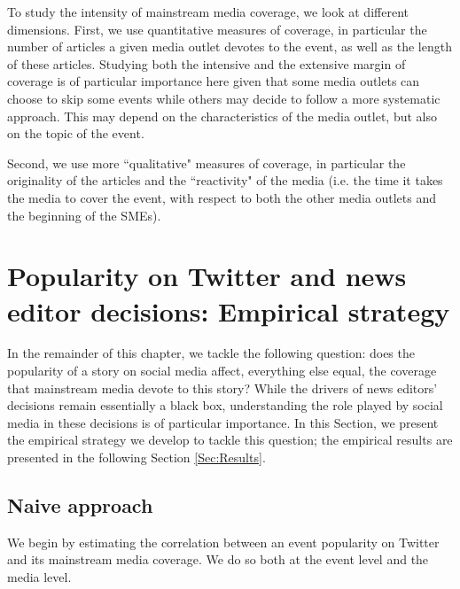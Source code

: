 To study the intensity of mainstream media coverage, we look at different dimensions. First, we use quantitative measures of coverage, in particular the number of articles a given media outlet devotes to the event, as well as the length of these articles. Studying both the intensive and the extensive margin of coverage is of particular importance here given that some media outlets can choose to skip some events while others may decide to follow a more systematic approach. This may depend on the characteristics of the media outlet, but also on the topic of the event.

Second, we use more ``qualitative" measures of coverage, in particular the originality of the articles \citep[following][]{CageHerveViaud2020} and the ``reactivity" of the media (i.e. the time it takes the media to cover the event, with respect to both the other media outlets and the beginning of the SMEs).


\section{Popularity on Twitter and news editor decisions: Empirical strategy\label{Sec:EmpiricalSpecification}}

In the remainder of this chapter, we tackle the following question: does the popularity of a story on social media affect, everything else equal, the coverage that mainstream media devote to this story? While the drivers of news editors' decisions remain essentially a black box, understanding the role played by social media in these decisions is of particular importance. In this Section, we present the empirical strategy we develop to tackle this question; the empirical results are presented in the following Section \ref{Sec:Results}.


\subsection{Naive approach\label{Sec:SpecificationOLS}}

We begin by estimating the correlation between an event popularity on Twitter and its mainstream media coverage. We do so both at the event level and the media level.


